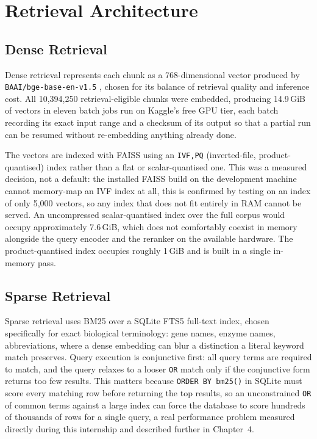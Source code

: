 \section{Retrieval Architecture}\label{3.3}

\subsection{Dense Retrieval}\label{3.3.1}

Dense retrieval represents each chunk as a 768-dimensional vector produced
by \texttt{BAAI/bge-base-en-v1.5} \cite{xiao2023bge}, chosen for its
balance of retrieval quality and inference cost. All 10{,}394{,}250
retrieval-eligible chunks were embedded, producing 14.9\,GiB of vectors in
eleven batch jobs run on Kaggle's free GPU tier, each batch recording its
exact input range and a checksum of its output so that a partial run can be
resumed without re-embedding anything already done.

The vectors are indexed with FAISS \cite{johnson2019faiss} using an
\texttt{IVF,PQ} (inverted-file, product-quantised) index rather than a
flat or scalar-quantised one. This was a measured decision, not a default:
the installed FAISS build on the development machine cannot memory-map an
IVF index at all, this is confirmed by testing on an index of only 5{,}000
vectors, so any index that does not fit entirely in RAM cannot be served.
An uncompressed scalar-quantised index over the full corpus would occupy
approximately 7.6\,GiB, which does not comfortably coexist in memory
alongside the query encoder and the reranker on the available hardware. The
product-quantised index occupies roughly 1\,GiB and is built in a single
in-memory pass.

\subsection{Sparse Retrieval}\label{3.3.2}

Sparse retrieval uses BM25 \cite{robertson2009bm25} over a SQLite
FTS5 full-text index, chosen specifically for exact biological
terminology: gene names, enzyme names, abbreviations, where a dense
embedding can blur a distinction a literal keyword match preserves.
Query execution is conjunctive first: all query terms are required to
match, and the query relaxes to a looser \texttt{OR} match only if the
conjunctive form returns too few results. This matters because
\texttt{ORDER BY bm25()} in SQLite must score every matching row before
returning the top results, so an unconstrained \texttt{OR} of common terms
against a large index can force the database to score hundreds of
thousands of rows for a single query, a real performance problem measured
directly during this internship and described further in Chapter~4.

